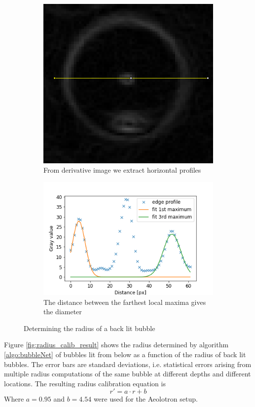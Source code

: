 			\begin{figure}
				\centering

				\begin{subfigure}[t]{.4\textwidth}
					\centering
					\includegraphics[scale=0.3]{images/green_edges.png}
					\caption{From derivative image we extract horizontal profiles}
				\end{subfigure}\hfill
				\begin{subfigure}[t]{.5\textwidth}
					\centering
					\includegraphics[scale=.6]{graphs/green_radius_demo.png}
					\caption{The distance between the farthest local maxima gives the diameter}
				\end{subfigure}
				
				\caption{Determining the radius of a back lit bubble}								
				\label{fig:green_radius}
			\end{figure}
			
			Figure \ref{fig:radius_calib_result} shows the radius determined by algorithm \ref{algo:bubbleNet} of bubbles lit from below as a function of the radius of back lit bubbles. The error bars are standard deviations, i.e. statistical errors arising from multiple radius computations of the same bubble at different depths and different locations. The resulting radius calibration equation is 
			\begin{equation}
				r' = a \cdot r + b
				\label{eq:radius_calib}
			\end{equation}
			Where $a= 0.95$ and $b=4.54$ were used for the Aeolotron setup. 
			
